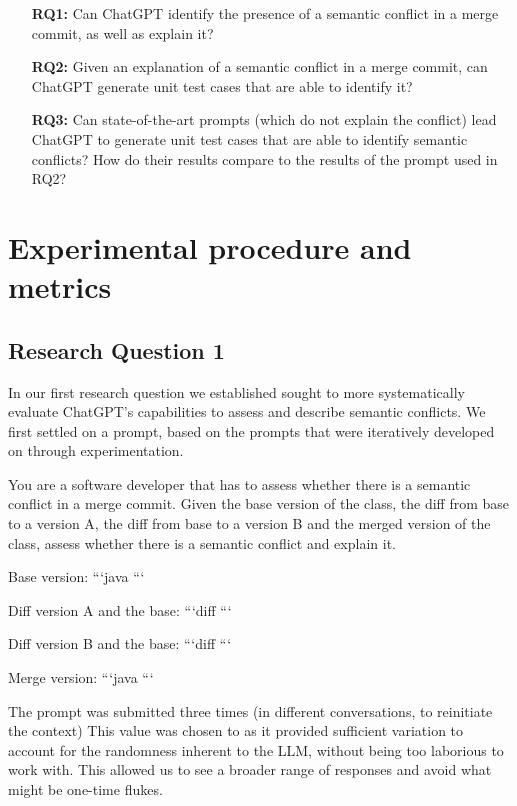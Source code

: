 \begin{itemize}
  \item[\textbf{RQ1:}] Can ChatGPT identify the presence of a semantic conflict in a merge commit, as well as explain it?

  \item[\textbf{RQ2:}] Given an explanation of a semantic conflict in a merge
  commit, can ChatGPT generate unit test cases that are able to identify it?

  \item[\textbf{RQ3:}] Can state-of-the-art prompts (which do not explain the conflict) lead ChatGPT to generate
  unit test cases that are able to identify semantic conflicts?  How do their
  results compare to the results of the prompt used in RQ2?
\end{itemize}

\section{Experimental procedure and metrics}

\subsection{Research Question 1}

In our first research question we established sought to more systematically evaluate ChatGPT's capabilities to assess and describe semantic conflicts.
We first settled on a prompt, based on the prompts that were iteratively developed on through experimentation.

\begin{prompt}
You are a software developer that has to assess whether there is a semantic conflict in a merge commit.  Given the base version of the class, the diff from base to a version A, the diff from base to a version B and the merged version of the class, assess whether there is a semantic conflict and explain it.

Base version:
```java
```

Diff version A and the base:
```diff
```

Diff version B and the base:
```diff
```

Merge version:
```java
```
\end{prompt}

The prompt was submitted three times (in different conversations, to reinitiate the context)
This value was chosen to as it provided sufficient variation to account for the randomness inherent to the
LLM, without being too laborious to work with.
This allowed us to see a broader range of responses and avoid
what might be one-time flukes.

